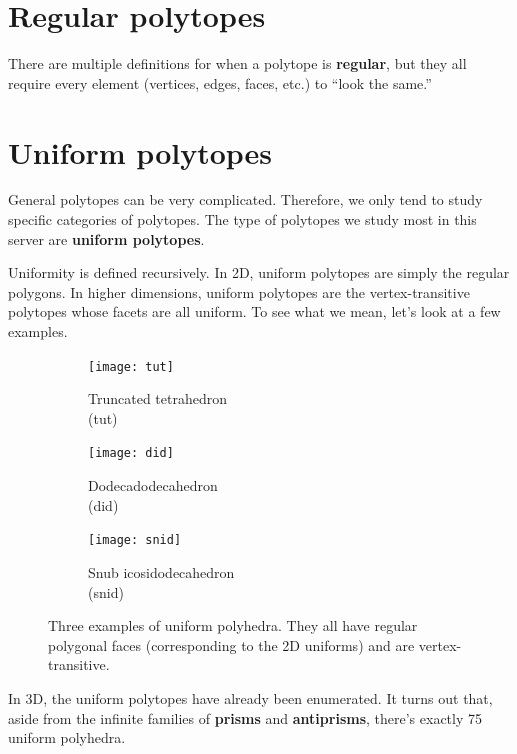 \documentclass{article}
\begin{document}


\section{Regular polytopes}
There are multiple definitions for when a polytope is \textbf{regular},
but they all require every element (vertices, edges, faces, etc.) to ``look the same.''

\section{Uniform polytopes}
General polytopes can be very complicated. Therefore, we only tend to study specific categories of polytopes. The type of polytopes we study most in this server are \textbf{uniform polytopes}.

Uniformity is defined recursively. In 2D, uniform polytopes are simply the regular polygons.
In higher dimensions, uniform polytopes are the vertex-transitive polytopes whose facets are all uniform. To see what we mean, let's look at a few examples.

\begin{figure}[H]
\centering
\begin{subfigure}{.33333\textwidth}
  \centering
  \texttt{[image: tut]}
  \caption{Truncated tetrahedron\\(tut)}
  \label{fig:tut}
\end{subfigure}%
\begin{subfigure}{.33333\textwidth}
  \centering
  \texttt{[image: did]}
  \caption{Dodecadodecahedron\\(did)}
  \label{fig:did}
\end{subfigure}%
\begin{subfigure}{.33333\textwidth}
  \centering
  \texttt{[image: snid]}
  \caption{Snub icosidodecahedron\\(snid)}
  \label{fig:snid}
\end{subfigure}%
\caption{Three examples of uniform polyhedra. They all have regular polygonal faces (corresponding to the 2D uniforms) and are vertex-transitive.}
\label{fig:uniforms3D}
\end{figure}

In 3D, the uniform polytopes have already been enumerated. It turns out that, aside from the infinite families of \textbf{prisms} and \textbf{antiprisms}, there's exactly 75 uniform polyhedra. %
\end{document}

